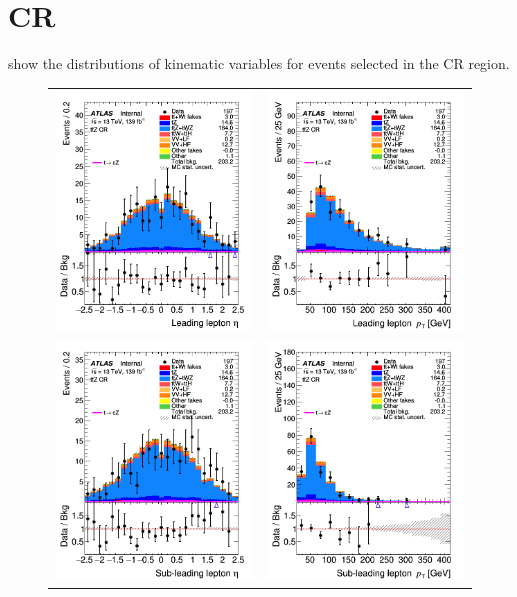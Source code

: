 \clearpage
\FloatBarrier
\section{\ttZ CR}
\label{app:CRs:ttZ}
 show the distributions 
of kinematic variables for events selected in the \ttZ CR region.

\begin{figure}[!htbp]
	\centering
	\begin{tabular}{cc}
		\includegraphics[width=.32\textwidth]{Appendices/AP5/figures/TTZCR/lep1_eta} &
		\includegraphics[width=.32\textwidth]{Appendices/AP5/figures/TTZCR/lep1_pt} \\
		\includegraphics[width=.32\textwidth]{Appendices/AP5/figures/TTZCR/lep2_eta} &
		\includegraphics[width=.32\textwidth]{Appendices/AP5/figures/TTZCR/lep2_pt} \\

\end{tabular}
\end{figure}

